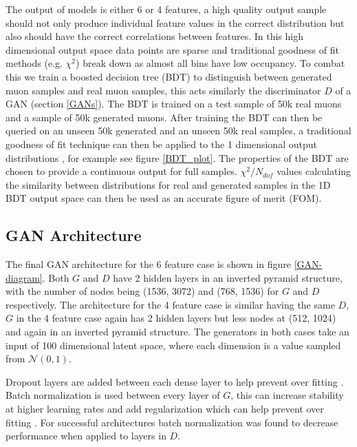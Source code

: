 \documentclass{article}
\begin{document}
        The output of models is either 6 or 4 features, a high quality output sample should not only produce individual feature values in the correct distribution but also should have the correct correlations between features. In this high dimensional output space data points are sparse and traditional goodness of fit methods (e.g. $\chi^2$) break down as almost all bins have low occupancy. To combat this we train a boosted decision tree (BDT) to distinguish between generated muon samples and real muon samples, this acts similarly the discriminator $D$ of a GAN (section \ref{GANs}). The BDT is trained on a test sample of 50k real muons and a sample of 50k generated muons. After training the BDT can then be queried on an unseen 50k generated and an unseen 50k real samples, a traditional goodness of fit technique can then be applied to the 1 dimensional output distributions \cite{weisser2016machine}, for example see figure \ref{BDT_plot}. The properties of the BDT are chosen to provide a continuous output for full samples. $\chi^2/N_{dof}$ values calculating the similarity between distributions for real and generated samples in the 1D BDT output space can then be used as an accurate figure of merit (FOM). 
        

    \subsection{GAN Architecture}\label{GAN_arch}
        
        
        The final GAN architecture for the 6 feature case is shown in figure \ref{GAN-diagram}. Both $G$ and $D$ have 2 hidden layers in an inverted pyramid structure, with the number of nodes being (1536, 3072) and (768, 1536) for $G$ and $D$ respectively. The architecture for the 4 feature case is similar having the same $D$, $G$ in the 4 feature case again has 2 hidden layers but less nodes at (512, 1024) and again in an inverted pyramid structure. The generators in both cases take an input of 100 dimensional latent space, where each dimension is a value sampled from $\mathcal{N} (0, 1)$. 
        
        Dropout layers are added between each dense layer to help prevent over fitting \cite{srivastava2014dropout}. Batch normalization is used between every layer of $G$, this can increase stability at higher learning rates and add regularization which can help prevent over fitting \cite{ioffe2015batch}. For successful architectures batch normalization was found to decrease performance when applied to layers in $D$.
        
\end{document}
